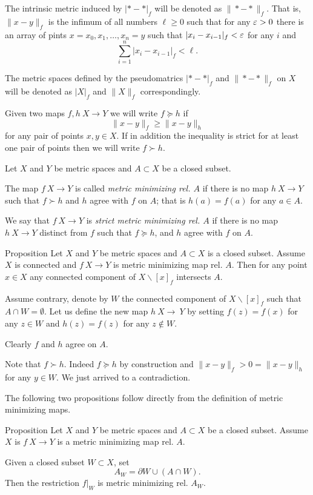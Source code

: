 \documentclass[a4paper,10pt]{amsart}
\begin{document}
The intrinsic metric induced by $|{*}-{*}|_f$ will be denoted as 
$\|{*}-{*}\|_f$. 
That is, 
$\|x-y\|_f$ is the infimum of all numbers $\ell\ge 0$ such that for any $\varepsilon>0$ there is an array of pints 
$x=x_0,x_1,\dots,x_n=y$ such that 
$|x_i-x_{i-1}|_f<\varepsilon$ for any $i$ and 
\[\sum_{i=1}^n|x_i-x_{i-1}|_f<\ell.\]

The metric spaces defined by the pseudomatrics $|{*}-{*}|_f$ 
and $\|{*}-{*}\|_f$ on $X$ will be denoted as $|X|_f$ and $\|X\|_f$ correspondingly.

Given two maps $f,h\:X\to Y$ we will write $f\succcurlyeq h$ if 
\[\|x-y\|_f\ge \|x-y\|_h\]
for any pair of points $x,y\in X$.
If in addition the inequality is strict for at least one pair of points then we will write $f\succ h$.

Let $X$ and $Y$ be metric spaces and $A\subset X$ be a closed subset.

The map $f\:X\to Y$ is called \emph{metric minimizing rel. $A$}
if there is no map $h\:X\to Y$ such that $f\succ h$
and $h$ agree with $f$ on $A$;
that is $h(a)=f(a)$ for any $a\in A$.

We say that $f\:X\to Y$ is \emph{strict metric minimizing rel. $A$}
if there is no map $h\:X\to Y$ distinct from $f$
such that $f\succcurlyeq h$, 
and $h$ agree with $f$ on $A$.

\begin{thm}{Proposition}\label{prop:point-complement}
Let $X$ and $Y$ be  metric spaces 
and $A\subset X$ is a closed subset.
Assume $X$ is connected and $f\:X\to Y$ is metric minimizing map rel. $A$.
Then for any point $x\in X$ any connected component of $X\backslash [x]_f$ intersects $A$.

\end{thm}

Assume contrary, denote by $W$ the connected component of $X\backslash [x]_f$ such that $A\cap W=\emptyset$.
Let us define the new map $h\:X\to\ Y$ 
by setting $f(z)=f(x)$ for any $z\in W$
and $h(z)=f(z)$ for any $z\notin W$.

Clearly $f$ and $h$ agree on $A$.

Note that $f\succ h$.
Indeed $f\succcurlyeq h$ by construction
and $\|x-y\|_f>0=\|x-y\|_h$ for any $y\in W$.
We just arrived to a contradiction.
\qeds

The following two propositions follow directly from the definition of metric minimizing maps.

\begin{thm}{Proposition}\label{prop:subset}
Let $X$ and $Y$ be metric spaces and $A\subset X$ be a closed subset.
Assume $X$ is $f\:X\to Y$ is a metric minimizing map rel. $A$.

Given a closed subset $W\subset X$, set 
\[A_W=\partial W\cup (A\cap W).\]
Then the restriction $f|_W$ is metric minimizing rel. $A_W$.
\end{thm}
\end{document}
